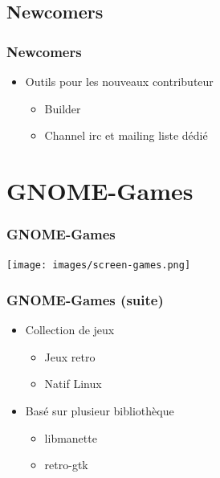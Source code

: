 \documentclass{beamer}
\begin{document}
\begin{frame}
\end{frame}

\subsection{Newcomers}
\begin{frame}
  \frametitle{Newcomers}
  \begin{itemize}
  \item Outils pour les nouveaux contributeur \pause
    \begin{itemize}
    \item Builder
    \item Channel irc et mailing liste dédié
    \end{itemize}
  \end{itemize}
\end{frame}

\section{GNOME-Games}
\begin{frame}
  \frametitle{GNOME-Games}
  \texttt{[image: images/screen-games.png]}
\end{frame}

\begin{frame}
  \frametitle{GNOME-Games (suite)}
  \begin{itemize}
  \item Collection de jeux \pause
    \begin{itemize}
    \item Jeux retro
    \item Natif Linux \pause
    \end{itemize}
  \item Basé sur plusieur bibliothèque \pause
    \begin{itemize}
    \item libmanette
    \item retro-gtk
    \end{itemize}
  \end{itemize}
\end{frame}
\end{document}
